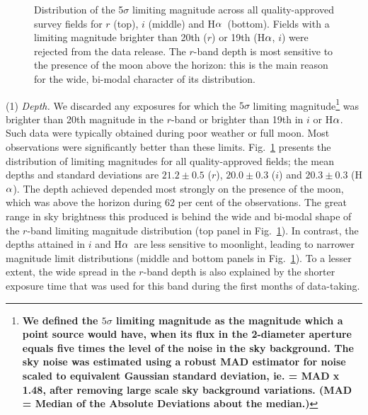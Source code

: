 \documentclass[a4paper,useAMS,usenatbib]{mn2e}
\def\ha{\mbox{H$\rm \alpha$}}
\begin{document}
\begin{figure}
\begin{minipage}[b]{\linewidth}
    \end{minipage}
    \caption{Distribution of the 5$\sigma$ limiting magnitude
             across all quality-approved survey fields
             for $r$ (top), $i$ (middle) and \ha\ (bottom).
             Fields with a limiting magnitude brighter than
             20th ($r$) or 19th (\ha, $i$) were rejected
             from the data release.
             The $r$-band depth is most sensitive 
             to the presence of the moon above the horizon: 
             this is the main reason for the wide, bi-modal character
             of its distribution.}
    \label{fig:depth}
\end{figure}

(1) \emph{Depth.} 
We discarded any exposures 
for which the $5\sigma$ limiting magnitude\footnote{\bf
We defined the $5\sigma$ limiting magnitude
as the magnitude which a point source would have,
when its flux in the 2-diameter aperture
equals five times the level of the noise in the sky background.
The sky noise was estimated using a robust MAD estimator 
for noise scaled to equivalent Gaussian standard deviation,
ie. = MAD x 1.48,
after removing large scale sky background variations.
(MAD = Median of the Absolute Deviations about the median.)}
was brighter than 20th magnitude in the $r$-band
or brighter than 19th in $i$ or \ha.
Such data were typically obtained during poor weather or full moon.
Most observations were significantly better than these limits.
Fig.~\ref{fig:depth} presents the distribution of limiting magnitudes
for all quality-approved fields;
the mean depths and standard deviations are 
$21.2\pm0.5$ ($r$), $20.0\pm0.3$ ($i$) and $20.3\pm0.3$ (\ha).
The depth achieved depended
most strongly on the presence of the moon,
which was above the horizon during 62 per cent 
of the observations.
The great range in sky brightness this
produced is behind the wide and bi-modal shape
of the $r$-band limiting magnitude distribution 
(top panel in Fig.~\ref{fig:depth}).
In contrast, the depths attained in $i$ and \ha\ 
are less sensitive to moonlight, leading to
narrower magnitude limit distributions
(middle and bottom panels in Fig.~\ref{fig:depth}).
To a lesser extent, the wide spread in the $r$-band depth
is also explained by the shorter exposure time
that was used for this band during the first months of data-taking.
\end{document}
